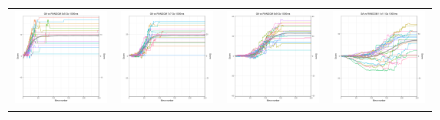 \begin{figure}
\begin{tabular}{cccc}
\hspace{-0.5cm}\includegraphics[width = 1.55in]{images/Visualizations/GAvsRANDOM/1000ms5x5.png} &
\hspace{-0.5cm}\includegraphics[width = 1.55in]{images/Visualizations/GAvsRANDOM/1000ms7x7.png} &
\hspace{-0.5cm}\includegraphics[width = 1.55in]{images/Visualizations/GAvsRANDOM/1000ms9x9.png} &
\hspace{-0.5cm}\includegraphics[width = 1.55in]{images/Visualizations/GAvsRANDOM/1000ms11x11.png} \\


\end{tabular}
\end{figure}
